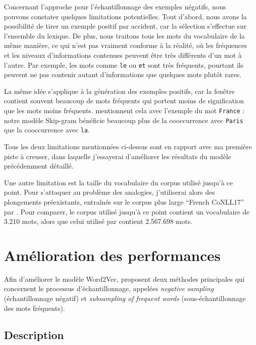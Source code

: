 \documentclass[12pt]{article}
\begin{document}
Concernant l'approche pour l'échantillonnage des exemples négatifs, nous pouvons constater quelques limitations potentielles. Tout d'abord, nous avons la possibilité de tirer un exemple positif par accident, car la sélection s'effectue sur l'ensemble du lexique. De plus, nous traitons tous les mots du vocabulaire de la même manière, ce qui n'est pas vraiment conforme à la réalité, où les fréquences et les niveaux d'informations contenues peuvent être très différents d'un mot à l'autre. Par exemple, les mots comme \texttt{le} ou \texttt{et} sont très fréquents, pourtant ils peuvent ne pas contenir autant d'informations que quelques mots plutôt rares. 

La même idée s'applique à la génération des exemples positifs, car la fenêtre contient souvent beaucoup de mots fréquents qui portent moins de signification que les mots moins fréquents. \cite{DBLP:conf/nips/MikolovSCCD13} mentionnent cela avec l'exemple du mot \texttt{France} : notre modèle Skip-gram bénéficie beaucoup plus de la cooccurrence avec \texttt{Paris} que la cooccurrence avec \texttt{la}. 

Tous les deux limitations mentionnées ci-dessus sont en rapport avec ma première piste à creuser, dans laquelle j'essayerai d'améliorer les résultats du modèle précédemment détaillé.  

Une autre limitation est la taille du vocabulaire du corpus utilisé jusqu'à ce point. Pour s'attaquer au problème des analogies, j'utiliserai alors des plongements préexistants, entraînés sur le corpus plus large ``French CoNLL17'' par \cite{fares-etal-2017-word}. Pour comparer, le corpus utilisé jusqu'à ce point contient un vocabulaire de 3.210 mots, alors que celui utilisé par \cite{fares-etal-2017-word} contient 2.567.698 mots.

\section{Amélioration des performances} \label{amélioration des performances}

Afin d'améliorer le modèle Word2Vec, \cite{DBLP:conf/nips/MikolovSCCD13} proposent deux méthodes principales qui concernent le processus d'échantillonnage, appelées \textit{negative sampling} (échantillonnage négatif) et \textit{subsampling of frequent words} (sous-échantillonnage des mots fréquents). 

\subsection{Description} \label{description-1}
\end{document}
